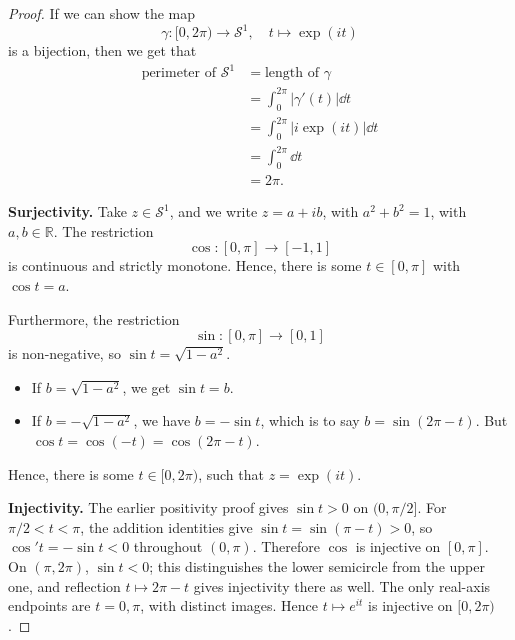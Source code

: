 \documentclass[11pt]{article}
\numberwithin{equation}{section}
\theoremstyle{definition}
\theoremstyle{remark}
\newcommand{\pqty}[1]{\left(#1\right)}
\newcommand{\abs}[1]{\left|#1\right|}
\newcommand{\ccintv}[2]{[#1,#2]}
\newcommand{\cointv}[2]{[#1,#2)}
\newcommand{\functiondomain}[3]{#1:#2\to #3}
\newcommand{\function}[5]{#1:#2\to #3,\quad #4\mapsto #5}
\newcommand{\RR}{\mathbb R}
\begin{document}
\begin{proof}
    If we can show the map
    \[
        \function{\gamma}{\cointv{0}{2\pi}}{\mathcal{S}^1}{t}{\exp \pqty{it}}
    \]
    is a bijection, then we get that
    \begin{align*}
        \text{perimeter of }\mathcal{S}^1 &= \text{length of }\gamma \\
        &= \int_{0}^{2 \pi} \abs{\gamma' \pqty{t}} \dd{t} \\
        &= \int_{0}^{2 \pi} \abs{i \exp \pqty{it}} \dd{t} \\
        &= \int_{0}^{2 \pi} \dd{t} \\
        &= 2 \pi.
    \end{align*}

    \textbf{Surjectivity.} Take \(z \in \mathcal{S}^1\), and we write \(z = a + ib\), with \(a^2 + b^2 = 1\), with \(a, b \in \RR\). The restriction
    \[
        \functiondomain{\cos}{\ccintv{0}{\pi}}{\ccintv{-1}{1}}
    \]
    is continuous and strictly monotone. Hence, there is some \(t \in \ccintv{0}{\pi}\) with \(\cos t = a\).

    Furthermore, the restriction
    \[
        \functiondomain{\sin}{\ccintv{0}{\pi}}{\ccintv{0}{1}}
    \]
    is non-negative, so \(\sin t = \sqrt{1 - a^2}\).
    
    \begin{itemize}
        \item If \(b = \sqrt{1 - a^2}\), we get \(\sin t = b\).
        \item If \(b = - \sqrt{1 - a^2}\), we have \(b = - \sin t\), which is to say \(b = \sin \pqty{2 \pi - t}\). But \(\cos t = \cos \pqty{-t} = \cos \pqty{2\pi - t}\).
    \end{itemize}

    Hence, there is some \(t \in \cointv{0}{2\pi}\), such that \(z = \exp \pqty{it}\).

    \textbf{Injectivity.} The earlier positivity proof gives \(\sin t>0\) on \((0,\pi/2]\).
For \(\pi/2<t<\pi\), the addition identities give \(\sin t=\sin(\pi-t)>0\),
so \(\cos' t=-\sin t<0\) throughout \((0,\pi)\). Therefore \(\cos\) is injective
on \([0,\pi]\). On \((\pi,2\pi)\), \(\sin t<0\); this distinguishes the lower
semicircle from the upper one, and reflection \(t\mapsto2\pi-t\) gives injectivity
there as well. The only real-axis endpoints are \(t=0,\pi\), with distinct images.
Hence \(t\mapsto e^{it}\) is injective on \([0,2\pi)\).
\end{proof}
\end{document}
